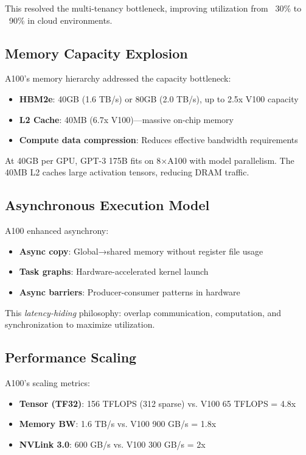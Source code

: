 \documentclass{article}
\begin{document}
This resolved the multi-tenancy bottleneck, improving utilization from ~30\% to ~90\% in cloud environments.

\subsection{Memory Capacity Explosion}

A100's memory hierarchy addressed the capacity bottleneck:
\begin{itemize}
\item \textbf{HBM2e}: 40GB (1.6 TB/s) or 80GB (2.0 TB/s), up to 2.5x V100 capacity
\item \textbf{L2 Cache}: 40MB (6.7x V100)—massive on-chip memory
\item \textbf{Compute data compression}: Reduces effective bandwidth requirements
\end{itemize}

At 40GB per GPU, GPT-3 175B fits on 8×A100 with model parallelism. The 40MB L2 caches large activation tensors, reducing DRAM traffic.

\subsection{Asynchronous Execution Model}

A100 enhanced asynchrony:
\begin{itemize}
\item \textbf{Async copy}: Global→shared memory without register file usage
\item \textbf{Task graphs}: Hardware-accelerated kernel launch
\item \textbf{Async barriers}: Producer-consumer patterns in hardware
\end{itemize}

This \textit{latency-hiding} philosophy: overlap communication, computation, and synchronization to maximize utilization.

\subsection{Performance Scaling}

A100's scaling metrics:
\begin{itemize}
\item \textbf{Tensor (TF32)}: 156 TFLOPS (312 sparse) vs. V100 65 TFLOPS = 4.8x
\item \textbf{Memory BW}: 1.6 TB/s vs. V100 900 GB/s = 1.8x
\item \textbf{NVLink 3.0}: 600 GB/s vs. V100 300 GB/s = 2x
\end{itemize}
\end{document}
